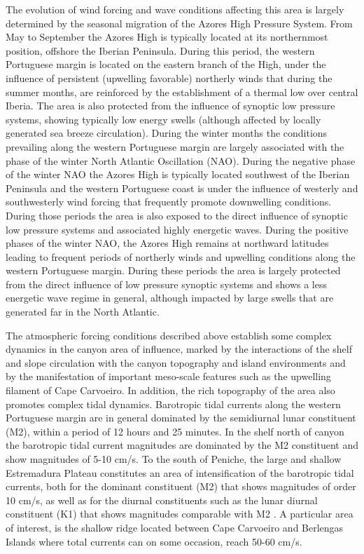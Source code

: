 The evolution of wind forcing and wave conditions affecting this area
is largely determined by the seasonal migration of the Azores High
Pressure System. From May to September the Azores High is typically
located at its northernmost position, offshore the Iberian
Peninsula. During this period, the western Portuguese margin is
located on the eastern branch of the High, under the influence of
persistent (upwelling favorable) northerly winds that during the
summer months, are reinforced by the establishment of a thermal low
over central Iberia. The area is also protected from the influence of
synoptic low pressure systems, showing typically low energy swells
(although affected by locally generated sea breeze
circulation). During the winter months the conditions prevailing along
the western Portuguese margin are largely associated with the phase of
the winter North Atlantic Oscillation (NAO). During the negative phase
of the winter NAO the Azores High is typically located southwest of
the Iberian Peninsula and the western Portuguese coast is under the
influence of westerly and southwesterly wind forcing that frequently
promote downwelling conditions. During those periods the area is also
exposed to the direct influence of synoptic low pressure systems and
associated highly energetic waves. During the positive phases of the
winter NAO, the Azores High remains at northward latitudes leading to
frequent periods of northerly winds and upwelling conditions along the
western Portuguese margin. During these periods the area is largely
protected from the direct influence of low pressure synoptic systems
and shows a less energetic wave regime in general, although impacted
by large swells that are generated far in the North Atlantic.

The atmospheric forcing conditions described above establish some
complex dynamics in the \naz canyon area of influence, marked by the
interactions of the shelf and slope circulation with the canyon
topography and island environments and by the manifestation of
important meso-scale features such as the upwelling filament of Cape
Carvoeiro. In addition, the rich topography of the area also promotes
complex tidal dynamics. Barotropic tidal currents along the western
Portuguese margin are in general dominated by the semidiurnal lunar
constituent (M2), within a period of 12 hours and 25 minutes.  In the
shelf north of \naz canyon the barotropic tidal current magnitudes are
dominated by the M2 constituent and show magnitudes of 5-10 cm/s. To
the south of Peniche, the large and shallow Estremadura Plateau
constitutes an area of intensification of the barotropic tidal
currents, both for the dominant constituent (M2) that shows magnitudes
of order 10 cm/s, as well as for the diurnal constituents such as the
lunar diurnal constituent (K1) that shows magnitudes comparable with
M2 \cite{marta06,quaresma13}. A particular area of interest, is the
shallow ridge located between Cape Carvoeiro and Berlengas Islands
where total currents can on some occasion, reach 50-60 cm/s.


